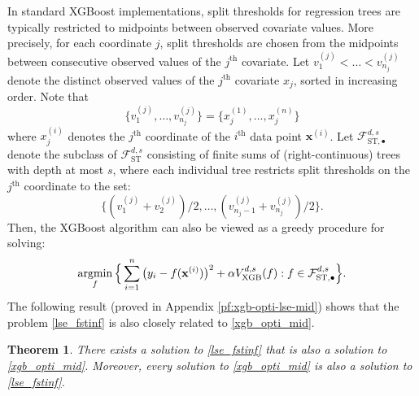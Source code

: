 \documentclass[10pt]{article}
\newtheorem{theorem}{Theorem}
\newcommand{\fst}{{\mathcal{F}^{d, s}_{\text{ST}}}}
\newcommand{\fstmid}{{\mathcal{F}^{d, s}_{\text{ST}, \bullet}}}
\newcommand{\vxgb}{{V^{d, s}_{\text{XGB}}}}
\newcommand{\xbf}{{\mathbf{x}}}
\def\argmin{\mathop{\rm argmin}}
\begin{document}
In standard XGBoost implementations, split thresholds for 
regression trees are typically restricted to midpoints between 
observed covariate values. More precisely, for each coordinate 
$j$, split thresholds are chosen from the midpoints between 
consecutive observed values of the $j^{\text{th}}$ covariate. Let 
$v^{(j)}_1 < \dots < v^{(j)}_{n_j}$ denote 
the distinct observed values of the $j^{\text{th}}$ covariate 
$x_j$, sorted in increasing order. Note that
\begin{equation*}
    \big\{v^{(j)}_1, \dots, v^{(j)}_{n_j}\big\} 
    = \big\{x^{(1)}_j, \dots, x^{(n)}_j\big\}
\end{equation*}
where $x^{(i)}_j$ denotes the $j^{\text{th}}$ coordinate of the 
$i^{\text{th}}$ data point $\xbf^{(i)}$. Let $\fstmid$ denote the 
subclass of $\fst$ consisting of finite sums of (right-continuous) 
trees with depth at most $s$, where each individual tree restricts 
split thresholds on the $j^{\text{th}}$ coordinate to the set:
\begin{equation*}
    \Big\{ (v^{(j)}_1 + v^{(j)}_2)/2, \dots, 
    (v^{(j)}_{n_j - 1} + v^{(j)}_{n_j})/2 \Big\}.  
\end{equation*}
Then, the XGBoost algorithm can also be viewed as a greedy 
procedure for solving: 
\begin{equation}\label{xgb_opti_mid}
    \argmin_{f} \Big\{\sum_{i=1}^n 
    \big(y_i - f(\xbf^{(i)})\big)^2 + \alpha \vxgb(f): 
    f \in \fstmid \Big\}.
\end{equation}
The following result (proved in Appendix \ref{pf:xgb-opti-lse-mid}) 
shows that the problem \eqref{lse_fstinf} is also closely related 
to \eqref{xgb_opti_mid}.
\begin{theorem}\label{thm:xgb-opti-lse-mid}
    There exists a solution to \eqref{lse_fstinf} that is also 
    a solution to \eqref{xgb_opti_mid}. Moreover, every solution 
    to \eqref{xgb_opti_mid} is also a solution to 
    \eqref{lse_fstinf}.   
\end{theorem}
\end{document}
